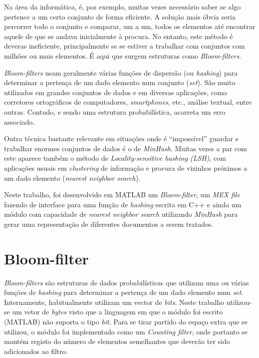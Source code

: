 \documentclass[a4paper,11pt,openright,oneside]{report}
\begin{document}
Na área da informática, é, por exemplo, muitas vezes necessário saber se algo pertence a um certo conjunto de forma eficiente. A solução mais óbvia seria percorrer todo o conjunto e comparar, um a um, todos os elementos até encontrar aquele de que se andava inicialmente à procura. No entanto, este método é deveras ineficiente, principalmente se se estiver a trabalhar com conjuntos com milhões ou mais elementos. É aqui que surgem estruturas como \textit{Bloom-filters}. 

\textit{Bloom-filters} usam geralmente várias funções de dispersão (ou \textit{hashing}) para determinar a pertença de um dado elemento num conjunto (\textit{set}). São muito utilizados em grandes conjuntos de dados e em diversas aplicações, como corretores ortográficos de computadores, \textit{smartphones}, etc., análise textual, entre outras. Contudo, e sendo uma estrutura probabilística, acarreta um erro associado.

Outra técnica bastante relevante em situações onde é ``impossível'' guardar e trabalhar enormes conjuntos de dados é o de \textit{MinHash}. Muitas vezes a par com este aparece também o método de \textit{Locality-sensitive hashing (LSH)}, com aplicações usuais em \textit{clustering} de informação e procura de vizinhos próximos a um dado elemento (\textit{nearest neighbor search}).

Neste trabalho, foi desenvolvido em MATLAB um \textit{Bloom-filter}, um \textit{MEX file} fazendo de interface para uma função de \textit{hashing} escrita em C++ e ainda um módulo com capacidade de \textit{nearest neighbor search} utilizando \textit{MinHash} para gerar uma representação de diferentes documentos a serem tratados.

\chapter{Bloom-filter}
\label{chap.bloom}

\textit{Bloom-filters} são estruturas de dados probabilísticas que utilizam uma ou várias funções de \textit{hashing} para determinar a pertença de um dado elemento num \textit{set}. Internamente, habitualmente utilizam um vector de \textit{bits}. Neste trabalho utilizou-se um vetor de \textit{bytes} visto que a linguagem em que o módulo foi escrito (MATLAB) não suporta o tipo \textit{bit}. Para se tirar partido do espaço extra que se utilizou, o módulo foi implementado como um \textit{Counting filter}, onde portanto se mantém registo do número de elementos semelhantes que deverão ter sido adicionados ao filtro.
\end{document}

